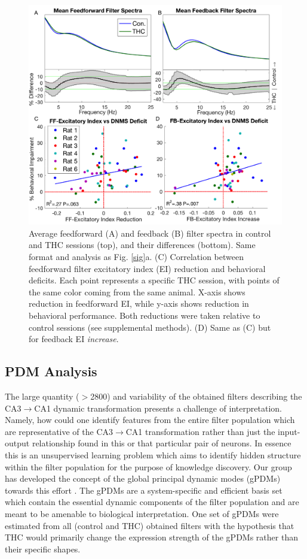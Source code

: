 \documentclass[11pt,a4paper,final]{article}
\begin{document}
\begin{figure}[!ht]
\centering
\includegraphics[width=120mm]{ker}
\caption[Kernel Population Metrics]{
Average feedforward (A) and feedback (B) filter spectra in control and THC sessions (top), and their differences (bottom). Same format and analysis as Fig. \ref{sig}a.
(C) Correlation between feedforward filter excitatory index (EI) reduction and behavioral deficits. Each point represents a specific THC session, with points of the same color coming from the same animal. X-axis shows reduction in feedforward EI, while y-axis shows reduction in behavioral performance. Both reductions were taken relative to control sessions (see supplemental methods).
(D) Same as (C) but for feedback EI \textit{increase}.}
\label{ker}
\end{figure}

    \subsection{PDM Analysis}

The large quantity ($>$2800) and variability of the obtained filters describing the CA3$\to$CA1 dynamic transformation presents a challenge of interpretation.
Namely, how could one identify features from the entire filter population which are representative of the CA3$\to$CA1 transformation rather than just the input-output relationship found in this or that particular pair of neurons.
In essence this is an unsupervised learning problem which aims to identify hidden structure within the filter population for the purpose of knowledge discovery.
Our group has developed the concept of the global principal dynamic modes (gPDMs) towards this effort \citep{marm04,marm13,sandler15stc}.
The gPDMs are a system-specific and efficient basis set which contain the essential dynamic components of the filter population and are meant to be amenable to biological interpretation.
One set of gPDMs were estimated from all (control and THC) obtained filters with the hypothesis that THC would primarily change the expression strength of the gPDMs rather than their specific shapes.
\end{document}
